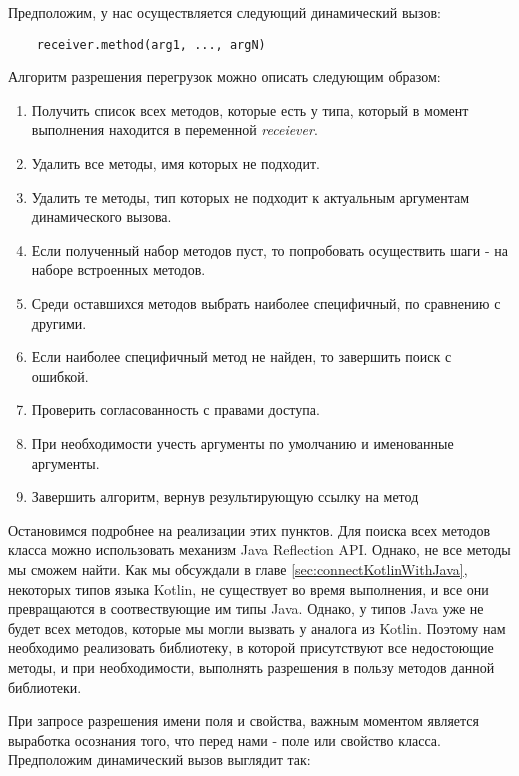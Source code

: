 Предположим, у нас осуществляется следующий динамический вызов:

\begin{verbatim}
    receiver.method(arg1, ..., argN)
\end{verbatim}

Алгоритм разрешения перегрузок можно описать следующим образом:

\begin{enumerate}
    \item Получить список всех методов, которые есть у типа, который в момент выполнения находится в переменной \textit{receiever}.
    \item Удалить все методы, имя которых не подходит.\label{itm:del1}
    \item Удалить те методы, тип которых не подходит к актуальным аргументам динамического вызова.\label{itm:del2}
    \item Если полученный набор методов пуст, то попробовать осуществить шаги \label{itm:del1}-\label{itm:del2} на наборе встроенных методов.
    \item Среди оставшихся методов выбрать наиболее специфичный, по сравнению с другими.
    \item Если наиболее специфичный метод не найден, то завершить поиск с ошибкой.
    \item Проверить согласованность с правами доступа.
    \item При необходимости учесть аргументы по умолчанию и именованные аргументы.
    \item Завершить алгоритм, вернув результирующую ссылку на метод
\end{enumerate}

Остановимся подробнее на реализации этих пунктов. Для поиска всех методов класса можно использовать механизм Java Reflection API. Однако, не все методы мы сможем найти. Как мы обсуждали в главе \ref{sec:connectKotlinWithJava}, некоторых типов языка Kotlin, не существует во время выполнения, и все они превращаются в соотвествующие им типы Java. Однако, у типов Java уже не будет всех методов, которые мы могли вызвать у аналога из Kotlin. Поэтому нам необходимо реализовать библиотеку, в которой присутствуют все недостоющие методы, и при необходимости, выполнять разрешения в пользу методов данной библиотеки.


При запросе разрешения имени поля и свойства, важным моментом является выработка осознания того, что перед нами - поле или свойство класса. Предположим динамический вызов выглядит так:

